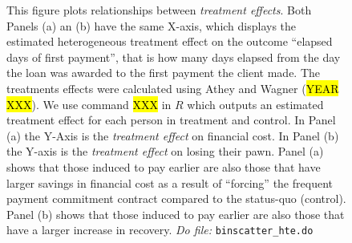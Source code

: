 \documentclass[11pt]{article}
\begin{document}
\begin{figure}[H]
       This figure plots relationships between \textit{treatment effects}. Both Panels (a) an (b) have the same X-axis, which displays the estimated heterogeneous treatment effect on the outcome ``elapsed days of first payment'', that is how many days elapsed from the day the loan was awarded to the first payment the client made. The treatments effects were calculated using Athey and Wagner (\hl{YEAR XXX}). We use command \hl{XXX} in $R$ which outputs an estimated treatment effect for each person in treatment and control. In Panel (a) the Y-Axis is the \textit{treatment effect} on financial cost. In Panel (b) the Y-axis is the \textit{treatment effect} on losing their pawn. Panel (a) shows that those induced to pay earlier are also those that have larger savings in financial cost as a result of ``forcing'' the frequent payment commitment contract compared to the status-quo (control). Panel (b) shows that those induced to pay earlier are also those that have a larger increase in recovery.
      \textit{Do file: }  \texttt{binscatter\_hte.do}
\end{figure}
\end{document}
